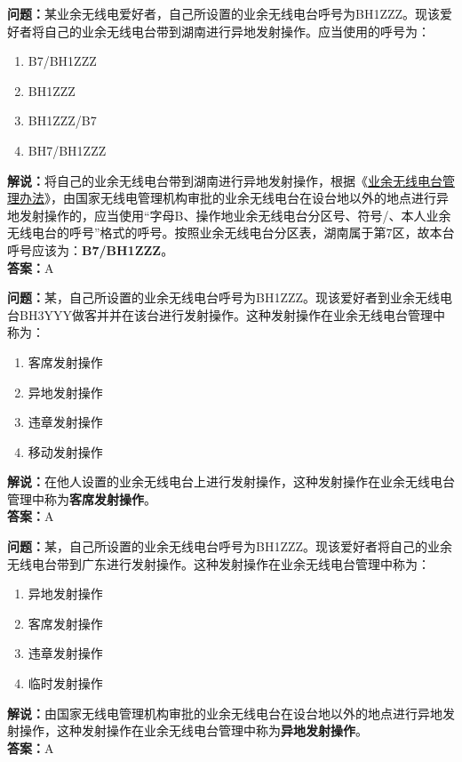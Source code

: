 \textbf{问题：}某业余无线电爱好者，自己所设置的业余无线电台呼号为BH1ZZZ。现该爱好者将自己的业余无线电台带到湖南进行异地发射操作。应当使用的呼号为：
\begin{enumerate}[label=\Alph*), leftmargin=1cm]
	\item B7/BH1ZZZ
	\item BH1ZZZ
	\item BH1ZZZ/B7
	\item BH7/BH1ZZZ
\end{enumerate}
\textbf{解说：}将自己的业余无线电台带到湖南进行异地发射操作，根据《\href{https://www.miit.gov.cn/jgsj/zfs/bmgz/art/2020/art_147b69815b3641caad9047735f94c860.html}{业余无线电台管理办法}》，由国家无线电管理机构审批的业余无线电台在设台地以外的地点进行异地发射操作的，应当使用“字母B、操作地业余无线电台分区号、符号/、本人业余无线电台的呼号”格式的呼号。按照业余无线电台分区表，湖南属于第7区，故本台呼号应该为：\textbf{B7/BH1ZZZ}。\\\textbf{答案：}A

\textbf{问题：}某，自己所设置的业余无线电台呼号为BH1ZZZ。现该爱好者到业余无线电台BH3YYY做客并并在该台进行发射操作。这种发射操作在业余无线电台管理中称为：
\begin{enumerate}[label=\Alph*), leftmargin=1cm]
	\item 客席发射操作
	\item 异地发射操作
	\item 违章发射操作
	\item 移动发射操作
\end{enumerate}
\textbf{解说：}在他人设置的业余无线电台上进行发射操作，这种发射操作在业余无线电台管理中称为\textbf{客席发射操作}。\\\textbf{答案：}A%

\textbf{问题：}某，自己所设置的业余无线电台呼号为BH1ZZZ。现该爱好者将自己的业余无线电台带到广东进行发射操作。这种发射操作在业余无线电台管理中称为：
\begin{enumerate}[label=\Alph*), leftmargin=1cm]
	\item 异地发射操作
	\item 客席发射操作
	\item 违章发射操作
	\item 临时发射操作
\end{enumerate}
\textbf{解说：}由国家无线电管理机构审批的业余无线电台在设台地以外的地点进行异地发射操作，这种发射操作在业余无线电台管理中称为\textbf{异地发射操作}。\\\textbf{答案：}A%

